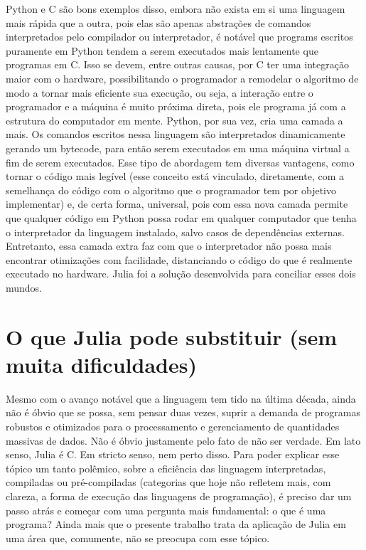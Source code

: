 Python e C são bons exemplos disso, embora não exista em si uma linguagem mais rápida que a outra, pois elas são apenas abstrações de comandos interpretados pelo compilador ou interpretador, é notável que programs escritos puramente em Python tendem a serem executados mais lentamente que programas em C. Isso se devem, entre outras causas, por C ter uma integração maior com o hardware, possibilitando o programador a remodelar o algoritmo de modo a tornar mais eficiente sua execução, ou seja, a interação entre o programador e a máquina é muito próxima direta, pois ele programa já com a estrutura do computador em mente. Python, por sua vez, cria uma camada a mais. Os comandos escritos nessa linguagem são interpretados dinamicamente gerando um bytecode, para então serem executados em uma máquina virtual a fim de serem executados. Esse tipo de abordagem tem diversas vantagens, como tornar o código mais legível (esse conceito está vinculado, diretamente, com a semelhança do código com o algoritmo que o programador tem por objetivo implementar) e, de certa forma, universal, pois com essa nova camada permite que qualquer código em Python possa rodar em qualquer computador que tenha o interpretador da linguagem instalado, salvo casos de dependências externas. Entretanto, essa camada extra faz com que o interpretador não possa mais encontrar otimizações com facilidade, distanciando o código do que é realmente executado no hardware. Julia foi a solução desenvolvida para conciliar esses dois mundos.

\section{O que Julia pode substituir (sem muita dificuldades)}

Mesmo com o avanço notável que a linguagem tem tido na última década, ainda não é óbvio que se possa, sem pensar duas vezes, suprir a demanda de programas robustos e otimizados para o processamento e gerenciamento de quantidades massivas de dados. Não é óbvio justamente pelo fato de não ser verdade. Em lato senso, Julia é C. Em stricto senso, nem perto disso. Para poder explicar esse tópico um tanto polêmico, sobre a eficiência das linguagem interpretadas, compiladas ou pré-compiladas (categorias que hoje não refletem mais, com clareza, a forma de execução das linguagens de programação), é preciso dar um passo atrás e começar com uma pergunta mais fundamental: o que é uma programa? Ainda mais que o presente trabalho trata da aplicação de Julia em uma área que, comumente, não se preocupa com esse tópico.

